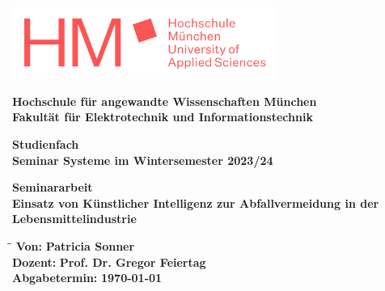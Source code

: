 \begin{titlepage}
    \raggedleft
    \includegraphics[width=0.65\textwidth]{Input/Bilder/HM-Logo-rot-Schriftzug.png}

    \centering
	\vspace{2cm}
    {\LARGE\bfseries Hochschule für angewandte Wissenschaften München\\}
    {\LARGE\bfseries Fakultät für Elektrotechnik und Informationstechnik\\}
	
    \vfill
	{\Large\bfseries Studienfach\\}
	{\LARGE\bfseries Seminar Systeme im Wintersemester 2023/24\\}
	
    \vfill
	{\Large\bfseries Seminararbeit\\}
    {\LARGE\bfseries Einsatz von Künstlicher Intelligenz zur Abfallvermeidung in der Lebensmittelindustrie\\} 

    \raggedright
    \vfill
    \begin{tabbing}
        \hspace*{0cm}\=\hspace*{3.5cm}\= \kill
        \>\textbf{Von:} \> \textbf{Patricia Sonner}\\
        \>\textbf{Dozent:} \> \textbf{Prof. Dr. Gregor Feiertag}\\
        \>\textbf{Abgabetermin:} \> \textbf{\today}\\
    \end{tabbing}
\end{titlepage}